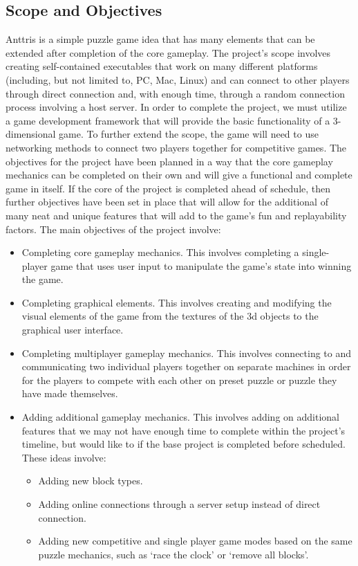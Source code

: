 \documentclass[12pt]{article}
\begin{document}
\subsection{Scope and Objectives}\label{scope-obj-CA}
Anttris is a simple puzzle game idea that has many elements that can be extended after completion of the core gameplay. The project’s scope involves creating self-contained executables that work on many different platforms (including, but not limited to, PC, Mac, Linux) and can connect to other players through direct connection and, with enough time, through a random connection process involving a host server. In order to complete the project, we must utilize a game development framework that will provide the basic functionality of a 3-dimensional game. To further extend the scope, the game will need to use networking methods to connect two players together for competitive games. The objectives for the project have been planned in a way that the core gameplay mechanics can be completed on their own and will give a functional and complete game in itself. If the core of the project is completed ahead of schedule, then further objectives have been set in place that will allow for the additional of many neat and unique features that will add to the game’s fun and replayability factors. The main objectives of the project involve:
\begin{itemize}
 \item Completing core gameplay mechanics. This involves completing a single-player game that uses user input to manipulate the game’s state into winning the game.
 \item Completing graphical elements. This involves creating and modifying the visual elements of the game from the textures of the 3d objects to the graphical user interface.
 \item Completing multiplayer gameplay mechanics. This involves connecting to and communicating two individual players together on separate machines in order for the players to compete with each other on preset puzzle or puzzle they have made themselves.
 \item Adding additional gameplay mechanics. This involves adding on additional features that we may not have enough time to complete within the project’s timeline, but would like to if the base project is completed before scheduled. These ideas involve:
  \begin{itemize}
  \item Adding new block types.
  \item Adding online connections through a server setup instead of direct connection.
  \item Adding new competitive and single player game modes based on the same puzzle mechanics, such as ‘race the clock’ or ‘remove all blocks’.
  \end{itemize}
\end{itemize}
\end{document}
